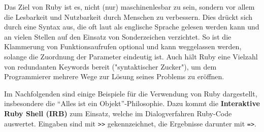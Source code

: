 Das Ziel von Ruby ist es, nicht (nur) maschinenlesbar zu sein, sondern vor allem die Lesbarkeit und Nutzbarkeit durch Menschen zu verbessern. Dies drückt sich durch eine Syntax aus, die oft laut als englische Sprache gelesen werden kann und an vielen Stellen auf den Einsatz von Sonderzeichen verzichtet. So ist die Klammerung von Funktionsaufrufen optional und kann weggelassen werden, solange die Zuordnung der Parameter eindeutig ist. Auch hält Ruby eine Vielzahl von redundanten Keywords bereit ("syntaktischer Zucker"), um dem Programmierer mehrere Wege zur Lösung seines Problems zu eröffnen.

\setlength{\epigraphwidth}{\marginparwidth}
\setlength{\epigraphwidth}{0.8\textwidth}

Im Nachfolgenden sind einige Beispiele für die Verwendung von Ruby dargestellt, insbesondere die "`Alles ist ein Objekt"'-Philosophie. Dazu kommt die \textbf{Interaktive Ruby Shell (IRB)} zum Einsatz, welche im Dialogverfahren Ruby-Code auswertet. Eingaben sind mit \verb+>>+ gekennzeichnet, die Ergebnisse darunter mit \texttt{=>}.

 \begin{ruby}[label=Interaktive Ruby Sitzung (IRB)]
    
      
    
     
 \end{ruby}


